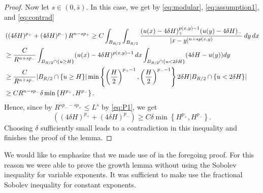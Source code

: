 \documentclass[11pt]{amsart}
\theoremstyle{plain}
\theoremstyle{definition}
\numberwithin{equation}{section}
\renewcommand{\d}{\textnormal{d}}
\begin{document}
\begin{proof}
Now let $s\in (0,\bar{s})$. In this case, we get by \eqref{eq:modular}, \eqref{eq:assumption1}, and \eqref{eq:contrad}
\begin{align*}
&\left((4\delta H)^{p_+} + (4\delta H)^{p_{-}}\right) R^{n-sp_{+}} \geq C\int_{B_{R/2}}\int_{B_{R/2}} \frac{(u(x)-4\delta H)_{+}^{p(x,y)-1} (u(y)-4\delta H)_{-}}{|x-y|^{n+sp(x,y)}}\, \d y\, \d x \\
& \geq \frac{C}{R^{n+sp_{-}}} \int_{B_{R/2}\cap \{u\geq H\}} (u(x)-4\delta H)^{p(x,y)-1} \, \d x \int_{B_{R/2}\cap \{u<2\delta H\}} (4\delta H-u(y)) \d y \\
& \geq \frac{C}{R^{n+sp_{-}}} |B_{R/2}\cap \{u\geq H\}| \min\left\lbrace \left( \frac{H}{2}\right)^{p_+-1}, \left( \frac{H}{2}\right)^{p_--1} \right\rbrace 2\delta H |B_{R/2}\cap \{u<2\delta H\}| \\
& \geq C R^{n-sp_{-}} \delta \min\left\{ H^{p_+}, H^{p_-}\right\}.
\end{align*}
Hence, since by $R^{sp_{-}-sp_{+}}\leq L^s$ by \eqref{eq:P1}, we get
\[ \left((4\delta H)^{p_+} + (4\delta H)^{p_{-}}\right) \geq C \delta \min\left\{ H^{p_+}, H^{p_-}\right\}.\]
Choosing $\delta$ sufficiently small leads to a contradiction in this inequality and finishes the proof of the lemma.
\end{proof}
We would like to emphasize that we made use of  in the foregoing proof. For this reason we were able to prove the growth lemma without using the Sobolev inequality for variable exponents. It was sufficient to make use the fractional Sobolev inequality for constant exponents. 
\end{document}
